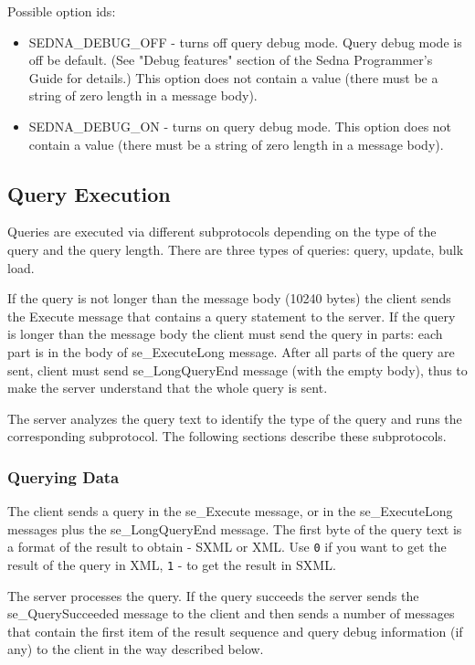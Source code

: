 \documentclass[a4paper,12pt]{article}
\begin{document}
Possible option ids:
\begin{itemize}
\item SEDNA\_DEBUG\_OFF - turns off query debug mode. Query debug mode is off be default. (See "Debug features" section of the Sedna Programmer's Guide for details.) This option does not contain a value (there must be a string of zero length in a message body).
\item SEDNA\_DEBUG\_ON - turns on query debug mode. This option does not contain a value (there must be a string of zero length in a message body).
\end{itemize} 

\subsection{Query Execution}

Queries are executed via different subprotocols depending on the type of the query and the query length. There are three types of queries: query, update, bulk load. 

If the query is not longer than the message body (10240 bytes) the client sends the Execute message that contains a query statement to the server. 
If the query is longer than the message body the client must send the query in parts: each part is in the body of se\_ExecuteLong message. After all parts of the query are sent, client must send se\_LongQueryEnd message (with the empty body), thus to make the server understand that the whole query is sent.


The server analyzes the query text to identify the type of the query and runs the corresponding subprotocol. The following sections describe these subprotocols. 

\subsubsection{Querying Data }

The client sends a query in the se\_Execute message, or in the se\_ExecuteLong messages plus the se\_LongQueryEnd message. The first byte of the query text is a format of the result to obtain - SXML \cite{paper:sxml} or XML. Use \verb!0! if you want to get the result of the query in XML, \verb!1! - to get the result in SXML.

The server processes the query. If the query succeeds the server sends the se\_QuerySucceeded message to the client and then sends a number of messages that contain the first item of the result sequence and query debug information (if any) to the client in the way described below.
\end{document}
